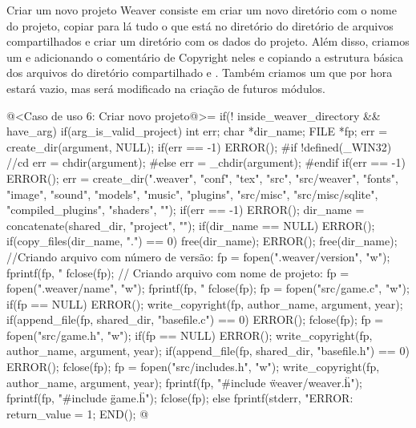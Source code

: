{

Criar um novo projeto Weaver consiste em criar um novo diretório com o
nome do projeto, copiar para lá tudo o que está no diretório
 do diretório de arquivos compartilhados e criar um
diretório  com os dados do projeto. Além disso,
criamos um  e  adicionando o
comentário de Copyright neles e copiando a estrutura básica dos
arquivos do diretório compartilhado  e
. Também criamos um
 que por hora estará vazio, mas será modificado
na criação de futuros módulos.

\iniciocodigo
@<Caso de uso 6: Criar novo projeto@>=
if(! inside_weaver_directory && have_arg){
  if(arg_is_valid_project){
    int err;
    char *dir_name;
    FILE *fp;
    err = create_dir(argument, NULL);
    if(err == -1) ERROR();
#if !defined(_WIN32) //cd
    err = chdir(argument);
#else
    err = _chdir(argument);
#endif
    if(err == -1) ERROR();
    err = create_dir(".weaver", "conf", "tex", "src", "src/weaver",
                     "fonts", "image", "sound", "models", "music",
                     "plugins", "src/misc", "src/misc/sqlite",
                     "compiled_plugins", "shaders", "");
    if(err == -1) ERROR();
    dir_name = concatenate(shared_dir, "project", "");
    if(dir_name == NULL) ERROR();
    if(copy_files(dir_name, ".") == 0){
      free(dir_name);
      ERROR();
    }
    free(dir_name); //Criando arquivo com número de versão:
    fp = fopen(".weaver/version", "w");
    fprintf(fp, "%
    fclose(fp); // Criando arquivo com nome de projeto:
    fp = fopen(".weaver/name", "w");
    fprintf(fp, "%
    fclose(fp);
    fp = fopen("src/game.c", "w");
    if(fp == NULL) ERROR();
    write_copyright(fp, author_name, argument, year);
    if(append_file(fp, shared_dir, "basefile.c") == 0) ERROR();
    fclose(fp);
    fp = fopen("src/game.h", "w");
    if(fp == NULL) ERROR();
    write_copyright(fp, author_name, argument, year);
    if(append_file(fp, shared_dir, "basefile.h") == 0) ERROR();
    fclose(fp);
    fp = fopen("src/includes.h", "w");
    write_copyright(fp, author_name, argument, year);
    fprintf(fp, "\n#include \"weaver/weaver.h\"\n");
    fprintf(fp, "\n#include \"game.h\"\n");
    fclose(fp);
  }
  else{
    fprintf(stderr, "ERROR: %
    return_value = 1;
  }
  END();
}
@
\fimcodigo

}

